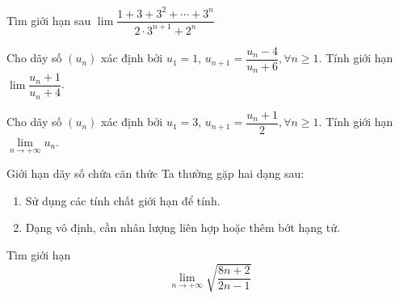 \begin{bt}%
	Tìm giới hạn sau $\lim\dfrac{1+3+3^2+\cdots +3^n}{2\cdot 3^{n+1}+2^n}$
\end{bt}
\begin{bt}%
	Cho dãy số $(u_n)$ xác định bởi $u_1=1$, $u_{n+1}=\dfrac{u_n-4}{u_n+6}, \forall n\geq 1$. Tính giới hạn $\lim\dfrac{u_n+1}{u_n+4}$.
\end{bt}

\begin{bt}%
	Cho dãy số $(u_n)$ xác định bởi $u_1=3$, $u_{n+1}=\dfrac{u_n+1}{2}, \forall n\geq 1$. Tính giới hạn $\lim \limits_{n \to +\infty}u_n$.
\end{bt}

\begin{dang}{Giới hạn dãy số chứa căn thức}
	Ta thường gặp hai dạng sau:
	\begin{enumerate}[Dạng 1.]
		\item Sử dụng các tính chất giới hạn để tính.
		\item Dạng vô định, cần nhân lượng liên hợp hoặc thêm bớt hạng tử.
	\end{enumerate}
\end{dang}
\begin{vd}%
	Tìm giới hạn $$\lim \limits_{n \to +\infty}\sqrt{\dfrac{8n+2}{2n-1}} $$
\end{vd}

